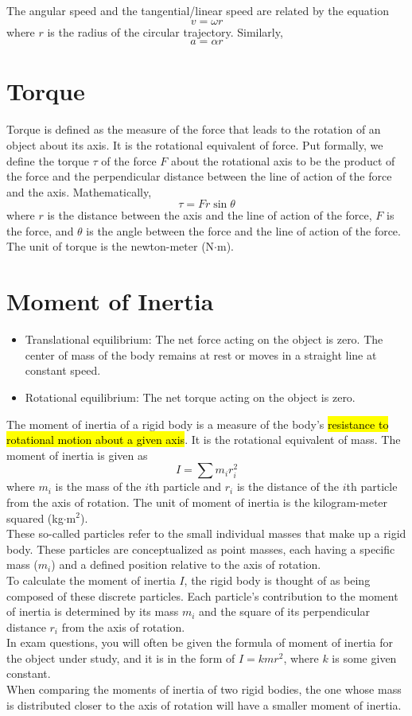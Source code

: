 \documentclass[a4paper,12pt]{article}
\let\oldsection\section
\renewcommand\section{\clearpage\oldsection}
\newcommand{\lb}{\\[8pt]}
\begin{document}
The angular speed and the tangential/linear speed are related by the equation $$v = \omega r$$where $r$ is the radius of the circular trajectory. Similarly, $$a = \alpha r$$

\section{Torque}

Torque is defined as the measure of the force that leads to the rotation of an object about its axis. It is the rotational equivalent of force. Put formally, we define the torque $\tau$ of the force $F$ about the rotational axis to be the product of the force and the perpendicular distance between the line of action of
the force and the axis. Mathematically, $$\tau = Fr\sin\theta$$where $r$ is the distance between the axis and the line of action of the force, $F$ is the force, and $\theta$ is the angle between the force and the line of action of the force. The unit of torque is the newton-meter (N$\cdot$m).

\section{Moment of Inertia}

\begin{itemize}
  \item Translational equilibrium: The net force acting on the object is zero. The center of mass of the body remains at rest or moves in a straight line at constant speed.
  \item Rotational equilibrium: The net torque acting on the object is zero.
\end{itemize}

The moment of inertia of a rigid body is a measure of the body's \hl{resistance to rotational motion about a given axis}. It is the rotational equivalent of mass. The moment of inertia is given as $$I = \sum m_ir_i^2$$where $m_i$ is the mass of the $i$th particle and $r_i$ is the distance of the $i$th particle from the axis of rotation. The unit of moment of inertia is the kilogram-meter squared (kg$\cdot$m$^2$).\lb
These so-called particles refer to the small individual masses that make up a rigid body. These particles are conceptualized as point masses, each having a specific mass ($m_i$) and a defined position relative to the axis of rotation.\lb
To calculate the moment of inertia $I$, the rigid body is thought of as being composed of these discrete particles. Each particle's contribution to the moment of inertia is determined by its mass $m_i$ and the square of its perpendicular distance $r_i$ from the axis of rotation.\lb
In exam questions, you will often be given the formula of moment of inertia for the object under study, and it is in the form of $I = kmr^2$, where $k$ is some given constant.\lb
When comparing the moments of inertia of two rigid bodies, the one whose mass is distributed closer to the axis of rotation will have a smaller moment of inertia.
\end{document}
